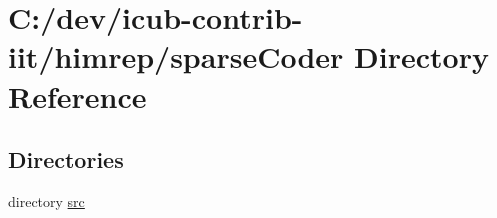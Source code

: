 \section{C\+:/dev/icub-\/contrib-\/iit/himrep/sparse\+Coder Directory Reference}
\label{dir_7415fe13f9036a555c1eb1c32c720325}
\subsection*{Directories}
\begin{DoxyCompactItemize}
\item 
directory \hyperlink{dir_450f4e14c121c7353d5681dddc1704f8}{src}
\end{DoxyCompactItemize}
